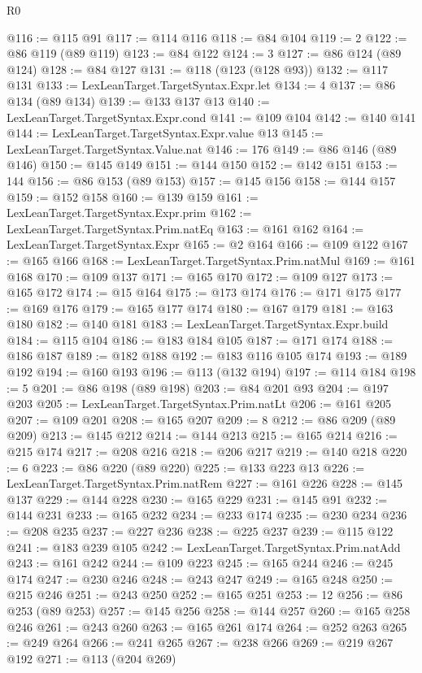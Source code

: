 \begin{lexlean}{R0}
\begin{coremodule}
@116 := @115 @91
@117 := @114 @116
@118 := @84 @104
@119 := 2
@122 := @86 @119 (@89 @119)
@123 := @84 @122
@124 := 3
@127 := @86 @124 (@89 @124)
@128 := @84 @127
@131 := @118 (@123 (@128 @93))
@132 := @117 @131
@133 := LexLeanTarget.TargetSyntax.Expr.let
@134 := 4
@137 := @86 @134 (@89 @134)
@139 := @133 @137 @13
@140 := LexLeanTarget.TargetSyntax.Expr.cond
@141 := @109 @104
@142 := @140 @141
@144 := LexLeanTarget.TargetSyntax.Expr.value @13
@145 := LexLeanTarget.TargetSyntax.Value.nat
@146 := 176
@149 := @86 @146 (@89 @146)
@150 := @145 @149
@151 := @144 @150
@152 := @142 @151
@153 := 144
@156 := @86 @153 (@89 @153)
@157 := @145 @156
@158 := @144 @157
@159 := @152 @158
@160 := @139 @159
@161 := LexLeanTarget.TargetSyntax.Expr.prim
@162 := LexLeanTarget.TargetSyntax.Prim.natEq
@163 := @161 @162
@164 := LexLeanTarget.TargetSyntax.Expr
@165 := @2 @164
@166 := @109 @122
@167 := @165 @166
@168 := LexLeanTarget.TargetSyntax.Prim.natMul
@169 := @161 @168
@170 := @109 @137
@171 := @165 @170
@172 := @109 @127
@173 := @165 @172
@174 := @15 @164
@175 := @173 @174
@176 := @171 @175
@177 := @169 @176
@179 := @165 @177 @174
@180 := @167 @179
@181 := @163 @180
@182 := @140 @181
@183 := LexLeanTarget.TargetSyntax.Expr.build
@184 := @115 @104
@186 := @183 @184 @105
@187 := @171 @174
@188 := @186 @187
@189 := @182 @188
@192 := @183 @116 @105 @174
@193 := @189 @192
@194 := @160 @193
@196 := @113 (@132 @194)
@197 := @114 @184
@198 := 5
@201 := @86 @198 (@89 @198)
@203 := @84 @201 @93
@204 := @197 @203
@205 := LexLeanTarget.TargetSyntax.Prim.natLt
@206 := @161 @205
@207 := @109 @201
@208 := @165 @207
@209 := 8
@212 := @86 @209 (@89 @209)
@213 := @145 @212
@214 := @144 @213
@215 := @165 @214
@216 := @215 @174
@217 := @208 @216
@218 := @206 @217
@219 := @140 @218
@220 := 6
@223 := @86 @220 (@89 @220)
@225 := @133 @223 @13
@226 := LexLeanTarget.TargetSyntax.Prim.natRem
@227 := @161 @226
@228 := @145 @137
@229 := @144 @228
@230 := @165 @229
@231 := @145 @91
@232 := @144 @231
@233 := @165 @232
@234 := @233 @174
@235 := @230 @234
@236 := @208 @235
@237 := @227 @236
@238 := @225 @237
@239 := @115 @122
@241 := @183 @239 @105
@242 := LexLeanTarget.TargetSyntax.Prim.natAdd
@243 := @161 @242
@244 := @109 @223
@245 := @165 @244
@246 := @245 @174
@247 := @230 @246
@248 := @243 @247
@249 := @165 @248
@250 := @215 @246
@251 := @243 @250
@252 := @165 @251
@253 := 12
@256 := @86 @253 (@89 @253)
@257 := @145 @256
@258 := @144 @257
@260 := @165 @258 @246
@261 := @243 @260
@263 := @165 @261 @174
@264 := @252 @263
@265 := @249 @264
@266 := @241 @265
@267 := @238 @266
@269 := @219 @267 @192
@271 := @113 (@204 @269)

\end{coremodule}
\end{lexlean}
